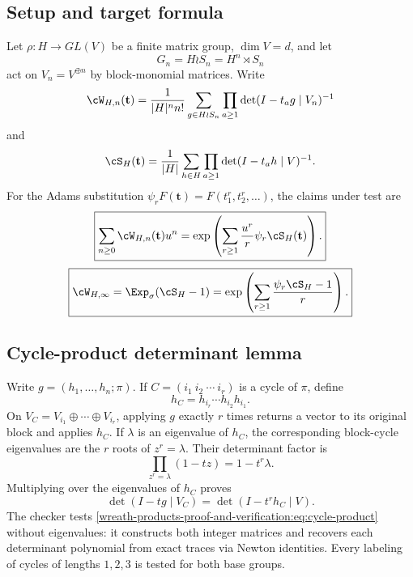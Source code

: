 \documentclass[10pt]{article}
\begin{document}
\subsection{Setup and target formula}
Let $\rho:H\to GL(V)$ be a finite matrix group, $\dim V=d$, and let
\[
 G_n=H\wr S_n=H^n\rtimes S_n
\]
act on $V_n=V^{\oplus n}$ by block-monomial matrices.  Write
\[
 \cW_{H,n}(\mathbf t)=\frac1{|H|^n n!}\sum_{g\in H\wr S_n}
 \prod_{a\ge1}\det(I-t_ag\mid V_n)^{-1}
\]
and
\[
 \cS_H(\mathbf t)=\frac1{|H|}\sum_{h\in H}
 \prod_{a\ge1}\det(I-t_ah\mid V)^{-1}.
\]
For the Adams substitution $\psi_rF(\mathbf t)=F(t_1^r,t_2^r,\ldots)$, the
claims under test are
\begin{equation}\label{wreath-products-proof-and-verification:eq:exact}
 \boxed{\displaystyle \sum_{n\ge0}\cW_{H,n}(\mathbf t)u^n
 =\exp\left(\sum_{r\ge1}\frac{u^r}{r}\psi_r\cS_H(\mathbf t)\right).}
\end{equation}
\begin{equation}\label{wreath-products-proof-and-verification:eq:stable}
 \boxed{\displaystyle \cW_{H,\infty}
 =\Exp_\sigma(\cS_H-1)
 =\exp\left(\sum_{r\ge1}\frac{\psi_r\cS_H-1}{r}\right).}
\end{equation}

\subsection{Cycle-product determinant lemma}
Write $g=(h_1,\ldots,h_n;\pi)$.  If
$C=(i_1\ i_2\ \cdots\ i_r)$ is a cycle of $\pi$, define
\[
 h_C=h_{i_r}\cdots h_{i_2}h_{i_1}.
\]
On $V_C=V_{i_1}\oplus\cdots\oplus V_{i_r}$, applying $g$ exactly $r$
times returns a vector to its original block and applies $h_C$.  If $\lambda$
is an eigenvalue of $h_C$, the corresponding block-cycle eigenvalues are the
$r$ roots of $z^r=\lambda$.  Their determinant factor is
\[
 \prod_{z^r=\lambda}(1-tz)=1-t^r\lambda.
\]
Multiplying over the eigenvalues of $h_C$ proves
\begin{equation}\label{wreath-products-proof-and-verification:eq:cycle-product}
 \boxed{\det(I-tg\mid V_C)=\det(I-t^rh_C\mid V).}
\end{equation}
The checker tests \eqref{wreath-products-proof-and-verification:eq:cycle-product} without eigenvalues: it constructs
both integer matrices and recovers each determinant polynomial from exact
traces via Newton identities.  Every labeling of cycles of lengths $1,2,3$
is tested for both base groups.
\end{document}
